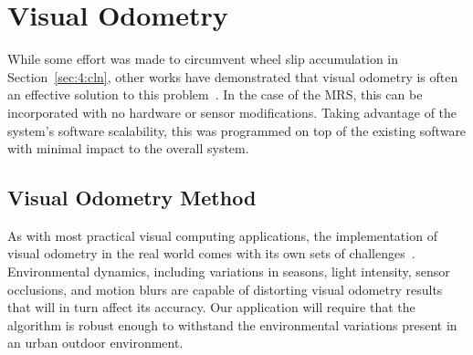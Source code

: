 \section{Visual Odometry}
While some effort was made to circumvent wheel slip accumulation in Section~\ref{sec:4:cln}, other works have demonstrated that visual odometry is often an effective solution to this problem~\cite{aqel_review_2016}. In the case of the MRS, this can be incorporated with no hardware or sensor modifications. Taking advantage of the system’s software scalability, this was programmed on top of the existing software with minimal impact to the overall system.

\subsection{Visual Odometry Method}
As with most practical visual computing applications, the implementation of visual odometry in the real world comes with its own sets of challenges~\cite{zhao_visual_2015}. Environmental dynamics, including variations in seasons, light intensity, sensor occlusions, and motion blurs are capable of distorting visual odometry results that will in turn affect its accuracy. Our application will require that the algorithm is robust enough to withstand the environmental variations present in an urban outdoor environment.

